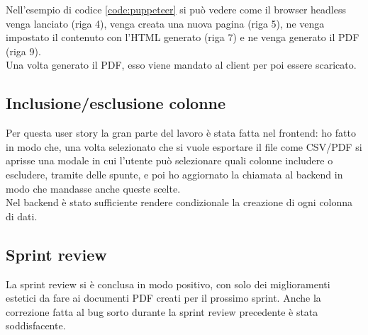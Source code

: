 \noindent Nell'esempio di codice \ref{code:puppeteer} si può vedere come il browser headless venga lanciato (riga 4), venga creata una nuova pagina (riga 5), ne venga impostato il contenuto con l'HTML generato (riga 7) e ne venga generato il PDF (riga 9).\\
Una volta generato il PDF, esso viene mandato al client per poi essere scaricato.

\subsection{Inclusione/esclusione colonne}
Per questa user story la gran parte del lavoro è stata fatta nel frontend: ho fatto in modo che, una volta selezionato che si vuole esportare il file come CSV/PDF si aprisse una modale in cui l'utente può selezionare quali colonne includere o escludere, tramite delle spunte, e poi ho aggiornato la chiamata al backend in modo che mandasse anche queste scelte.\\
Nel backend è stato sufficiente rendere condizionale la creazione di ogni colonna di dati.

\subsection{Sprint review}
La sprint review si è conclusa in modo positivo, con solo dei miglioramenti estetici da fare ai documenti PDF creati per il prossimo sprint. Anche la correzione fatta al bug sorto durante la sprint review precedente è stata soddisfacente. 